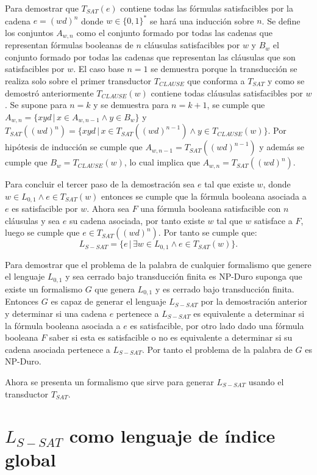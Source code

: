 Para demostrar que $T_{SAT}(e)$ contiene todas las fórmulas satisfacibles por la cadena $e=(wd)^n$ donde $w\in\{0,1\}^*$
se hará una inducción sobre $n$. Se define los  conjuntos $A_{w,n}$ como el conjunto formado por todas las cadenas
que representan fórmulas booleanas de $n$ cláusulas satisfacibles por $w$ y $B_w$ el conjunto formado por todas las cadenas que representan las
cláusulas que son satisfacibles por $w$. El caso base $n=1$ se demuestra
porque la transducción se realiza solo sobre el primer transductor $T_{CLAUSE}$ que conforma a $T_{SAT}$ y como
se demostró anteriormente $T_{CLAUSE}(w)$ contiene todas cláusulas satisfacibles por $w$.
Se supone para $n=k$ y se demuestra para $n=k+1$, se cumple que $A_{w,n}=\{xyd\,|\,x\in A_{w,n-1} \wedge y\in B_w\}$ y
$T_{SAT}((wd)^n)=\{xyd\,|\,x\in T_{SAT}((wd)^{n-1}) \wedge y\in T_{CLAUSE}(w)\}$. Por hipótesis de inducción se cumple
que $A_{w,n-1}=T_{SAT}((wd)^{n-1})$ y además se cumple que $B_w=T_{CLAUSE}(w)$, lo cual implica que $A_{w,n}=T_{SAT}((wd)^n)$.

Para concluir el tercer paso de la demostración sea $e$ tal que existe $w$, donde $w \in L_{0,1} \wedge e \in T_{SAT}(w)$
entonces se cumple que la fórmula booleana asociada a $e$ es satisfacible por $w$. Ahora sea $F$ una fórmula booleana
satisfacible con $n$ cláusulas y sea $e$ su cadena asociada, por tanto existe $w$ tal que $w$ satisface a $F$,
luego se cumple que $e\in T_{SAT}((wd)^n)$. Por tanto se cumple que:
$$L_{S-SAT} = \{e\,|\,\exists w \in L_{0,1} \wedge e \in T_{SAT}(w) \}.$$

Para demostrar que el problema de la palabra de cualquier formalismo que genere el lenguaje $L_{0,1}$ y sea cerrado bajo transducción
finita es NP-Duro suponga que existe un formalismo $G$ que genera $L_{0,1}$ y es cerrado bajo transducción finita.
Entonces $G$ es capaz de generar el lenguaje $L_{S-SAT}$ por la demostración anterior y determinar si una cadena $e$ pertenece a $L_{S-SAT}$ es
equivalente a determinar si la fórmula booleana asociada a $e$ es satisfacible, por otro lado dado una fórmula booleana $F$
saber si esta es satisfacible o no es equivalente a determinar si su cadena asociada pertenece a $L_{S-SAT}$. Por tanto
el problema de la palabra de $G$ es NP-Duro.

Ahora se presenta un formalismo que sirve para generar $L_{S-SAT}$ usando el transductor $T_{SAT}$.

\section{$L_{S-SAT}$ como lenguaje de índice global}

